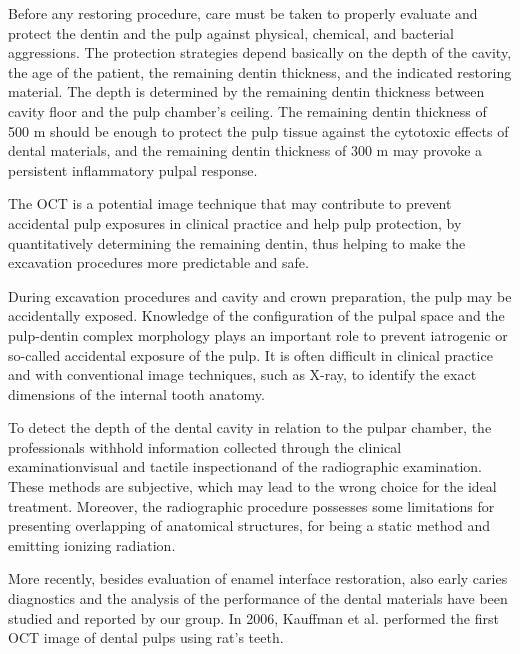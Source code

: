\documentclass[12pt,twoside,english]{book}
\renewcommand{\~}{\perispomeni}%
\DeclareRobustCommand{\textgreek}[1]{\leavevmode{\greektext #1}}
\numberwithin{equation}{section}
\numberwithin{figure}{section}
\begin{document}
Before any restoring procedure, care must be taken to properly evaluate and protect the dentin and the pulp against physical, chemical, and bacterial aggressions. The protection strategies depend basically on the depth of the cavity, the age of the patient, the remaining dentin thickness, and the indicated restoring material. The depth is determined by the remaining dentin thickness between cavity floor and the pulp chamber's ceiling. The remaining dentin thickness of 500 \textgreek{m}m should be enough to protect the pulp tissue against the cytotoxic effects of dental materials\cite{Hanks:1988p2379}, and the remaining dentin thickness of 300 \textgreek{m}m may provoke a persistent inflammatory pulpal response.

The OCT is a potential image technique that may contribute to prevent accidental pulp exposures in clinical practice and help pulp protection, by quantitatively determining the remaining dentin, thus helping to make the excavation procedures more predictable and safe.

During excavation procedures and cavity and crown preparation, the pulp may be accidentally exposed. Knowledge of the configuration of the pulpal space and the pulp-dentin complex morphology plays an important role to prevent iatrogenic or so-called accidental exposure of the pulp. It is often difficult in clinical practice and with conventional image techniques, such as X-ray, to identify the exact dimensions of the internal tooth anatomy\cite{Mjor:2002p2276}.

To detect the depth of the dental cavity in relation to the pulpar chamber, the professionals withhold information collected through the clinical examination\textemdash visual and tactile inspection\textemdash and of the radiographic examination. These methods are subjective, which may lead to the wrong choice for the ideal treatment. Moreover, the radiographic procedure possesses some limitations for presenting overlapping of anatomical structures, for being a static method and emitting ionizing radiation.

More recently, besides evaluation of enamel interface restoration\cite{DeMelo:2005p2100}, also early caries diagnostics\cite{Freitas:2009p2142} and the analysis of the performance of the dental materials\cite{Kyotoku:2007p788,Braz:2009p2143} have been studied and reported by our group. In 2006, Kauffman et al. performed the first OCT image of dental pulps using rat's teeth\cite{Kauffman:2006p2144}.
\end{document}
